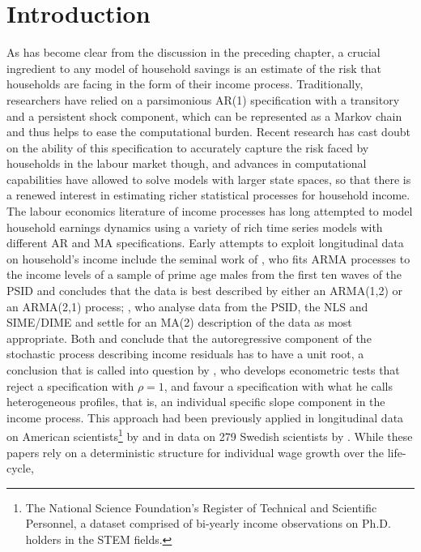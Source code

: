 \section[Introduction]{Introduction}
As has become clear from the discussion in the preceding chapter, a crucial
ingredient to any model of household savings is an estimate of the risk that
households are facing in the form of their income process. Traditionally,
researchers have relied on a parsimonious AR(1) specification with a transitory
and a persistent shock component, which can be represented as a Markov chain
and thus helps to ease the computational burden. Recent research has cast doubt
on the ability of this specification to accurately capture the risk faced by
households in the labour market though, and advances in computational
capabilities have allowed to solve models with larger state spaces, so that
there is a renewed interest in estimating richer statistical processes for
household income. \vspace{1cm}
\\
The labour economics literature of income processes has long attempted to model
household earnings dynamics using a variety of rich time series models with 
different AR and MA specifications. Early attempts to exploit longitudinal data
on household's income include the seminal work of \citet{MaCurdy1982}, who fits
ARMA processes to the income levels of a sample of prime age males from the first
ten waves of the PSID and concludes that the data is best described by either an
ARMA(1,2) or an ARMA(2,1) process; \citet{AbowdCard89}, who analyse data from the
PSID, the NLS and SIME/DIME and settle for an MA(2) description of the data as
most appropriate. Both \cite{MaCurdy1982} and \citet{AbowdCard89} conclude that 
the autoregressive component of the stochastic process describing income 
residuals has to have a unit root, a conclusion that is called into question by
\citet{Baker1997}, who develops econometric tests that reject a specification 
with $\rho=1$, and favour a specification with what he calls heterogeneous 
profiles, that is, an individual specific slope component in the income process.
This approach had been previously applied in longitudinal data on American 
scientists\footnote{The National Science Foundation's Register of Technical and
Scientific Personnel, a dataset comprised of bi-yearly income observations on 
Ph.D. holders in the STEM fields.} by \citet{LillardWeiss1978} and in data on 279
Swedish scientists by \citet{Hause1980}. While these papers rely on a deterministic
structure for individual wage growth over the life-cycle, \citet{Guvenen2009}
